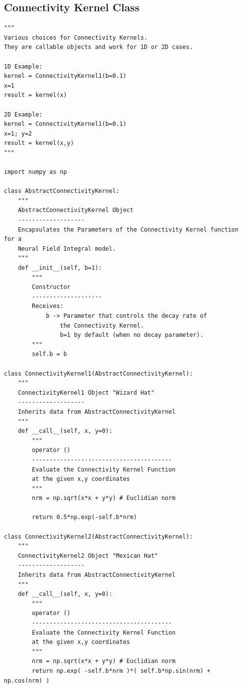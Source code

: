 \documentclass{uonmathreport}
\begin{document}
\subsection{Connectivity Kernel Class} \label{app:connectivity_kernel}
\begin{verbatim}
"""
Various choices for Connectivity Kernels.
They are callable objects and work for 1D or 2D cases.

1D Example:
kernel = ConnectivityKernel1(b=0.1)
x=1
result = kernel(x)

2D Example:
kernel = ConnectivityKernel1(b=0.1)
x=1; y=2
result = kernel(x,y)
"""

import numpy as np

class AbstractConnectivityKernel:
	"""
	AbstractConnectivityKernel Object
	-------------------
	Encapsulates the Parameters of the Connectivity Kernel function for a 
	Neural Field Integral model.
	"""
	def __init__(self, b=1):
		"""
		Constructor
		--------------------
		Receives:
			b -> Parameter that controls the decay rate of
				the Connectivity Kernel.
				b=1 by default (when no decay parameter).
		"""
		self.b = b

class ConnectivityKernel1(AbstractConnectivityKernel):
	"""
	ConnectivityKernel1 Object "Wizard Hat"
	-------------------
	Inherits data from AbstractConnectivityKernel 
	"""
	def __call__(self, x, y=0):
		"""
		operator ()
		----------------------------------------
		Evaluate the Connectivity Kernel Function 
		at the given x,y coordinates
		"""
		nrm = np.sqrt(x*x + y*y) # Euclidian norm
		
		return 0.5*np.exp(-self.b*nrm)

class ConnectivityKernel2(AbstractConnectivityKernel):
	"""
	ConnectivityKernel2 Object "Mexican Hat"
	-------------------
	Inherits data from AbstractConnectivityKernel 
	"""
	def __call__(self, x, y=0):
		"""
		operator ()
		----------------------------------------
		Evaluate the Connectivity Kernel Function 
		at the given x,y coordinates
		"""
		nrm = np.sqrt(x*x + y*y) # Euclidian norm
		return np.exp( -self.b*nrm )*( self.b*np.sin(nrm) + np.cos(nrm) )
\end{verbatim}
\end{document}
